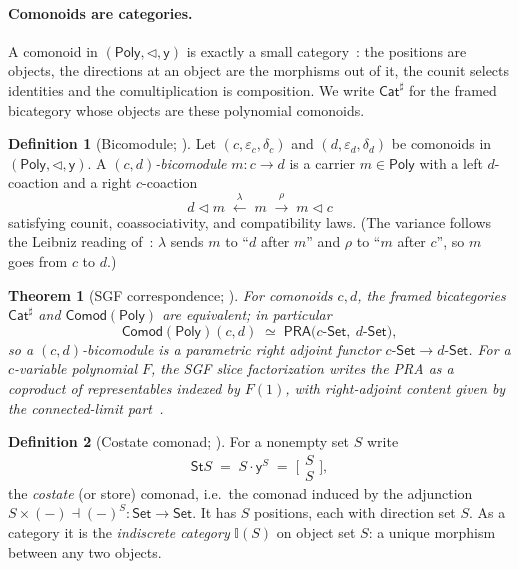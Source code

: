 \documentclass[11pt]{article}
\newcommand{\comp}{\mathbin{\triangleleft}}       %
\newcommand{\Set}{\mathsf{Set}}
\newcommand{\Poly}{\mathsf{Poly}}
\newcommand{\Cat}{\mathsf{Cat}^{\sharp}}
\newcommand{\Comod}{\mathsf{Comod}}
\newcommand{\PRA}{\mathsf{PRA}}
\newcommand{\St}{\mathsf{St}}                      %
\newcommand{\I}{\mathbb{I}}                        %
\newcommand{\y}{\mathsf{y}}
\theoremstyle{plain}
\newtheorem{theorem}{Theorem}
\theoremstyle{definition}
\newtheorem{definition}{Definition}
\theoremstyle{remark}
\begin{document}
\paragraph{Comonoids are categories.}
A comonoid in $(\Poly,\comp,\y)$ is exactly a small category~\cite[Prop.~5.2]{SGF}: the
positions are objects, the directions at an object are the morphisms out of it, the counit
selects identities and the comultiplication is composition. We write $\Cat$ for the
framed bicategory whose objects are these polynomial comonoids.

\begin{definition}[Bicomodule; {\cite[Def.~4.2, Rmk~4.3]{SGF}}]\label{def:bicomod}
Let $(c,\varepsilon_c,\delta_c)$ and $(d,\varepsilon_d,\delta_d)$ be comonoids in
$(\Poly,\comp,\y)$. A \emph{$(c,d)$-bicomodule} $m\colon c\to d$ is a carrier $m\in\Poly$
with a left $d$-coaction and a right $c$-coaction
\[
   d\comp m \;\xleftarrow{\ \lambda\ }\; m \;\xrightarrow{\ \rho\ }\; m\comp c
\]
satisfying counit, coassociativity, and compatibility laws. (The variance follows the
Leibniz reading of~\cite[Rmk~4.3]{SGF}: $\lambda$ sends $m$ to ``$d$ after $m$'' and $\rho$
to ``$m$ after $c$'', so $m$ goes from $c$ to $d$.)
\end{definition}

\begin{theorem}[SGF correspondence; {\cite[Prop.~3.9, Thm.~4.28]{SGF}}]\label{thm:sgf}
For comonoids $c,d$, the framed bicategories $\Cat$ and $\Comod(\Poly)$ are equivalent;
in particular
\[
  \Comod(\Poly)(c,d)\;\simeq\;\PRA\bigl(c\text{-}\Set,\ d\text{-}\Set\bigr),
\]
so a $(c,d)$-bicomodule \emph{is} a parametric right adjoint functor
$c\text{-}\Set\to d\text{-}\Set$. For a $c$-variable polynomial $F$, the SGF slice
factorization writes the PRA as a coproduct of representables indexed by $F(1)$, with
right-adjoint content given by the connected-limit part~\cite[Prop.~3.6]{SGF}.
\end{theorem}

\begin{definition}[Costate comonad; {\cite[Ex.~5.6]{SGF}}]\label{def:costate}
For a nonempty set $S$ write
\[
  \St S \;=\; S\cdot\y^{S} \;=\; \textstyle\bigl[\begin{smallmatrix}S\\S\end{smallmatrix}\bigr],
\]
the \emph{costate} (or store) comonad, i.e.\ the comonad induced by the adjunction
$S\times(-)\dashv(-)^S\colon\Set\to\Set$. It has $S$ positions, each with direction set
$S$. As a category it is the \emph{indiscrete category} $\I(S)$ on object set $S$: a unique
morphism between any two objects.
\end{definition}
\end{document}
